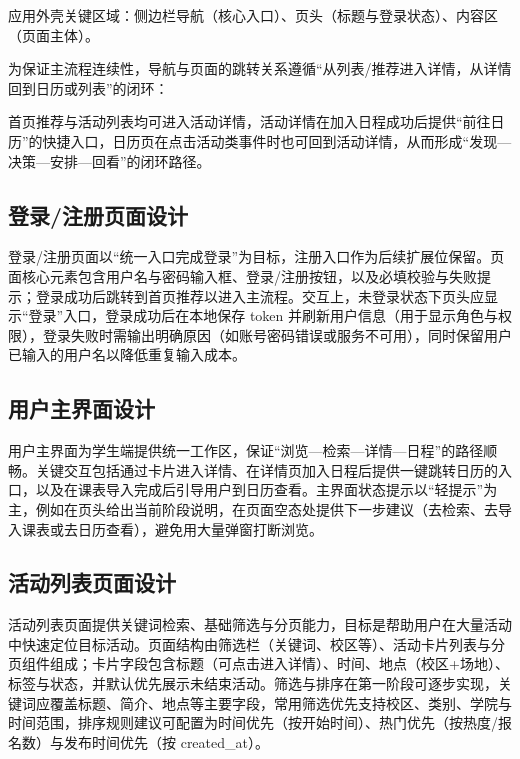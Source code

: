 \documentclass[UTF8,a4paper,12pt,fontset=none]{ctexrep}
\begin{document}
应用外壳关键区域：侧边栏导航（核心入口）、页头（标题与登录状态）、内容区（页面主体）。

为保证主流程连续性，导航与页面的跳转关系遵循``从列表/推荐进入详情，从详情回到日历或列表''的闭环：

首页推荐与活动列表均可进入活动详情，活动详情在加入日程成功后提供``前往日历''的快捷入口，日历页在点击活动类事件时也可回到活动详情，从而形成``发现---决策---安排---回看''的闭环路径。

\subsection{登录/注册页面设计}\label{ux767bux5f55ux6ce8ux518cux9875ux9762ux8bbeux8ba1}

登录/注册页面以``统一入口完成登录''为目标，注册入口作为后续扩展位保留。页面核心元素包含用户名与密码输入框、登录/注册按钮，以及必填校验与失败提示；登录成功后跳转到首页推荐以进入主流程。交互上，未登录状态下页头应显示``登录''入口，登录成功后在本地保存 token 并刷新用户信息（用于显示角色与权限），登录失败时需输出明确原因（如账号密码错误或服务不可用），同时保留用户已输入的用户名以降低重复输入成本。

\subsection{用户主界面设计}\label{ux7528ux6237ux4e3bux754cux9762ux8bbeux8ba1}

用户主界面为学生端提供统一工作区，保证``浏览---检索---详情---日程''的路径顺畅。关键交互包括通过卡片进入详情、在详情页加入日程后提供一键跳转日历的入口，以及在课表导入完成后引导用户到日历查看。主界面状态提示以``轻提示''为主，例如在页头给出当前阶段说明，在页面空态处提供下一步建议（去检索、去导入课表或去日历查看），避免用大量弹窗打断浏览。

\subsection{活动列表页面设计}\label{ux6d3bux52a8ux5217ux8868ux9875ux9762ux8bbeux8ba1}

活动列表页面提供关键词检索、基础筛选与分页能力，目标是帮助用户在大量活动中快速定位目标活动。页面结构由筛选栏（关键词、校区等）、活动卡片列表与分页组件组成；卡片字段包含标题（可点击进入详情）、时间、地点（校区+场地）、标签与状态，并默认优先展示未结束活动。筛选与排序在第一阶段可逐步实现，关键词应覆盖标题、简介、地点等主要字段，常用筛选优先支持校区、类别、学院与时间范围，排序规则建议可配置为时间优先（按开始时间）、热门优先（按热度/报名数）与发布时间优先（按 created\_at）。
\end{document}
